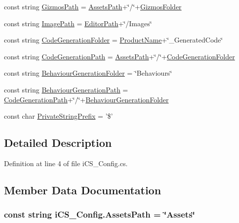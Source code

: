 \begin{DoxyCompactItemize}
\item 
const string \hyperlink{classi_c_s___config_a7deb8fdd0a9734848127198b9f6f071e}{Gizmos\+Path} = \hyperlink{classi_c_s___config_a97c18809af498cfdb5c1d6b3e129f8c8}{Assets\+Path}+\char`\"{}/\char`\"{}+\hyperlink{classi_c_s___config_ab6c5e096caef44eeea54b2750d4a623e}{Gizmos\+Folder}
\item 
const string \hyperlink{classi_c_s___config_ae1a2253b034fcde9a0e4e9654c98a7f8}{Image\+Path} = \hyperlink{classi_c_s___config_a97f62a34e25595599ce79964a3f51bc5}{Editor\+Path}+\char`\"{}/Images\char`\"{}
\item 
const string \hyperlink{classi_c_s___config_a79ee0c6f9afd0a4b5bdb49b41688f9c7}{Code\+Generation\+Folder} = \hyperlink{classi_c_s___config_a237de99fe2941f28906828de3715218c}{Product\+Name}+\char`\"{}\+\_\+\+Generated\+Code\char`\"{}
\item 
const string \hyperlink{classi_c_s___config_a5d73558b0fff9dac84766a3626da6a57}{Code\+Generation\+Path} = \hyperlink{classi_c_s___config_a97c18809af498cfdb5c1d6b3e129f8c8}{Assets\+Path}+\char`\"{}/\char`\"{}+\hyperlink{classi_c_s___config_a79ee0c6f9afd0a4b5bdb49b41688f9c7}{Code\+Generation\+Folder}
\item 
const string \hyperlink{classi_c_s___config_ab151f2194203643fef8497b327b8d878}{Behaviour\+Generation\+Folder} = \char`\"{}Behaviours\char`\"{}
\item 
const string \hyperlink{classi_c_s___config_afcd9d55f10a72604d909c8f6056c1518}{Behaviour\+Generation\+Path} = \hyperlink{classi_c_s___config_a5d73558b0fff9dac84766a3626da6a57}{Code\+Generation\+Path}+\char`\"{}/\char`\"{}+\hyperlink{classi_c_s___config_ab151f2194203643fef8497b327b8d878}{Behaviour\+Generation\+Folder}
\item 
const char \hyperlink{classi_c_s___config_a041043c87536d7d80dc01e3afb3c9300}{Private\+String\+Prefix} = '\$'
\end{DoxyCompactItemize}


\subsection{Detailed Description}


Definition at line 4 of file i\+C\+S\+\_\+\+Config.\+cs.



\subsection{Member Data Documentation}
\hypertarget{classi_c_s___config_a97c18809af498cfdb5c1d6b3e129f8c8}{
\subsubsection[{Assets\+Path}]{\setlength{\rightskip}{0pt plus 5cm}const string i\+C\+S\+\_\+\+Config.\+Assets\+Path = \char`\"{}Assets\char`\"{}}}\label{classi_c_s___config_a97c18809af498cfdb5c1d6b3e129f8c8}


